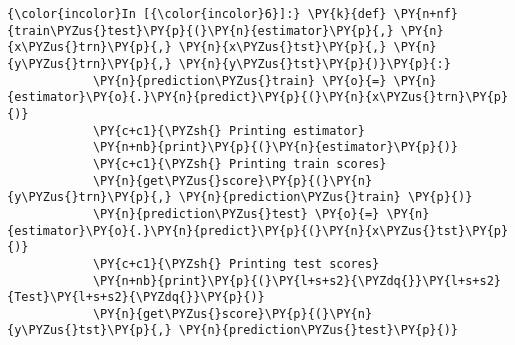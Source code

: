     \begin{Verbatim}[commandchars=\\\{\}]
{\color{incolor}In [{\color{incolor}6}]:} \PY{k}{def} \PY{n+nf}{train\PYZus{}test}\PY{p}{(}\PY{n}{estimator}\PY{p}{,} \PY{n}{x\PYZus{}trn}\PY{p}{,} \PY{n}{x\PYZus{}tst}\PY{p}{,} \PY{n}{y\PYZus{}trn}\PY{p}{,} \PY{n}{y\PYZus{}tst}\PY{p}{)}\PY{p}{:}
            \PY{n}{prediction\PYZus{}train} \PY{o}{=} \PY{n}{estimator}\PY{o}{.}\PY{n}{predict}\PY{p}{(}\PY{n}{x\PYZus{}trn}\PY{p}{)}
            \PY{c+c1}{\PYZsh{} Printing estimator}
            \PY{n+nb}{print}\PY{p}{(}\PY{n}{estimator}\PY{p}{)}
            \PY{c+c1}{\PYZsh{} Printing train scores}
            \PY{n}{get\PYZus{}score}\PY{p}{(}\PY{n}{y\PYZus{}trn}\PY{p}{,} \PY{n}{prediction\PYZus{}train} \PY{p}{)}
            \PY{n}{prediction\PYZus{}test} \PY{o}{=} \PY{n}{estimator}\PY{o}{.}\PY{n}{predict}\PY{p}{(}\PY{n}{x\PYZus{}tst}\PY{p}{)}
            \PY{c+c1}{\PYZsh{} Printing test scores}
            \PY{n+nb}{print}\PY{p}{(}\PY{l+s+s2}{\PYZdq{}}\PY{l+s+s2}{Test}\PY{l+s+s2}{\PYZdq{}}\PY{p}{)}
            \PY{n}{get\PYZus{}score}\PY{p}{(}\PY{n}{y\PYZus{}tst}\PY{p}{,} \PY{n}{prediction\PYZus{}test}\PY{p}{)}    
\end{Verbatim}


